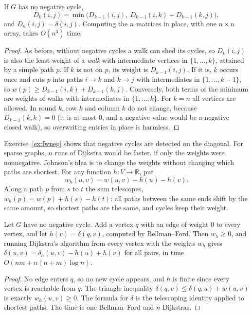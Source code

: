 \begin{theorem}\label{thm:floyd}
If $G$ has no negative cycle,
\[
D_k(i,j)=\min\big(D_{k-1}(i,j),\ D_{k-1}(i,k)+D_{k-1}(k,j)\big),
\]
and $D_n(i,j)=\delta(i,j)$. Computing the $n$ matrices in place, with one $n\times n$ array, takes $O(n^3)$ time.
\end{theorem}
\begin{proof}
As before, without negative cycles a walk can shed its cycles, so $D_k(i,j)$ is also the least weight of a \emph{walk} with intermediate vertices in $\{1,\dots,k\}$, attained by a simple path $p$. If $k$ is not on $p$, its
weight is $D_{k-1}(i,j)$. If it is, $k$ occurs once and cuts $p$ into paths $i\to k$ and $k\to j$ with intermediates in $\{1,\dots,k-1\}$, so $w(p)\ge D_{k-1}(i,k)+D_{k-1}(k,j)$. Conversely, both terms of the minimum are weights of
walks with intermediates in $\{1,\dots,k\}$. For $k=n$ all vertices are allowed. In round $k$, row $k$ and column $k$ do not change, because $D_{k-1}(k,k)=0$ (it is at most $0$, and a negative value would be a negative closed walk),
so overwriting entries in place is harmless.
\end{proof}

Exercise~\ref{ex:fwneg} shows that negative cycles are detected on the diagonal. For sparse graphs, $n$ runs of Dijkstra would be faster, if only the weights were nonnegative. Johnson's idea is to change the weights
without changing which paths are shortest. For any function $h:V\to\mathbb R$, put
\[
w_h(u,v)=w(u,v)+h(u)-h(v).
\]
Along a path $p$ from $s$ to $t$ the sum telescopes, $w_h(p)=w(p)+h(s)-h(t)$: all paths between the same ends shift by the same amount, so shortest paths are the same, and cycles keep their weight.

\begin{theorem}[Johnson, 1977]\label{thm:johnson}
Let $G$ have no negative cycle. Add a vertex $q$ with an edge of weight $0$ to every vertex, and let $h(v)=\delta(q,v)$, computed by Bellman--Ford. Then $w_h\ge0$, and running Dijkstra's algorithm from every vertex
with the weights $w_h$ gives $\delta(u,v)=\delta_h(u,v)-h(u)+h(v)$ for all pairs, in time $O(nm+n(n+m)\log n)$.
\end{theorem}
\begin{proof}
No edge enters $q$, so no new cycle appears, and $h$ is finite since every vertex is reachable from $q$. The triangle inequality $\delta(q,v)\le\delta(q,u)+w(u,v)$ is exactly $w_h(u,v)\ge0$. The formula for $\delta$ is the
telescoping identity applied to shortest paths. The time is one Bellman--Ford and $n$ Dijkstras.
\end{proof}

